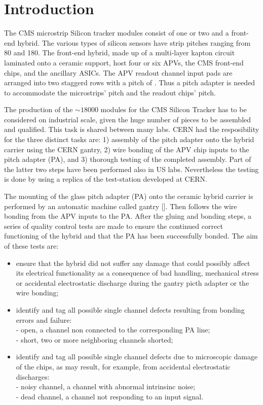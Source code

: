 \section{Introduction}

The CMS microstrip Silicon tracker modules consist of one or two and a
front-end hybrid. The various types of silicon sensors have strip
pitches ranging from 80 and 180. The front-end hybrid, made up of a
multi-layer kapton circuit laminated onto a ceramic support, host four
or six APVs, the CMS front-end chips, and the ancillary ASICs. The APV
readout channel input pads are arranged into two staggerd rows with a
pitch of . Thus a pitch adapter is needed to accommodate the
microstrips' pitch and the readout chips' pitch.
 
The production of the $\sim18000$ modules for the CMS Silicon Tracker
has to be considered on industrial scale, given the huge number of
pieces to be assembled and qualified. This task is shared between many
labs. CERN had the resposibility for the three distinct tasks are: 1)
assembly of the pitch adapter onto the hybrid carrier using the CERN
gantry, 2) wire bonding of the APV chip inputs to the pitch adapter (PA),
and 3) thorough testing of the completed assembly. Part of the latter
two steps have been performed also in US labs. Nevertheless the
testing is done by using a replica of the test-station developed at CERN.

The mounting of the glass pitch adapter (PA) onto the ceramic hybrid
carrier is performed by an automatic machine called gantry []. Then
follows the wire bonding from the APV inputs to the PA. After the
gluing and bonding steps, a series of quality control tests are made
to ensure the continued correct functioning of the hybrid and that the
PA has been successfully bonded. The aim of these tests are:
\begin{itemize}
\item ensure that the hybrid did not suffer any damage that could
  possibly affect its electrical functionality as a consequence of bad
  handling, mechanical stress or accidental electrostatic discharge
  during the gantry picth adapter or the wire bonding;
\item identify and tag all possible single channel defects resulting
  from bonding errors and failure:\\
- open, a channel non connected
  to the corresponding PA line;\\
- short, two or more neighboring
  channels shorted;
\item identify and tag all possible single channel defects due to
  microscopic damage of the chips, as may result, for example, from
  accidental electrostatic discharges:\\
- noisy channel, a channel with abnormal intrinsinc noise;\\
- dead channel, a channel not responding to an input signal.
\end{itemize}

